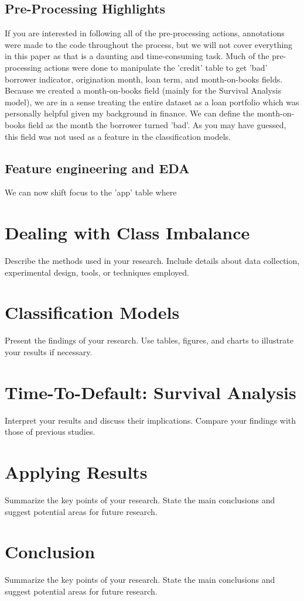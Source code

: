 \documentclass[12pt]{article}
\begin{document}
\subsection{Pre-Processing Highlights}
If you are interested in following all of the pre-processing actions, annotations were made to the code throughout the process, but we will not cover everything in this paper as that is a daunting and time-consuming task.
Much of the pre-processing actions were done to manipulate the 'credit' table to get 'bad' borrower indicator, origination month, loan term, and month-on-books fields.
Because we created a month-on-books field (mainly for the Survival Analysis model), we are in a sense treating the entire dataset as a loan portfolio which was personally helpful given my background in finance.
We can define the month-on-books field as the month the borrower turned 'bad'.
As you may have guessed, this field was not used as a feature in the classification models.
\newpage

\subsection{Feature engineering and EDA}
We can now shift focus to the 'app' table where 


\section{Dealing with Class Imbalance}
Describe the methods used in your research. Include details about data collection, experimental design, tools, or techniques employed.

\section{Classification Models}
Present the findings of your research. Use tables, figures, and charts to illustrate your results if necessary.

\section{Time-To-Default: Survival Analysis}
Interpret your results and discuss their implications. Compare your findings with those of previous studies.

\section{Applying Results}
Summarize the key points of your research. State the main conclusions and suggest potential areas for future research.

\section{Conclusion}
Summarize the key points of your research. State the main conclusions and suggest potential areas for future research.

\printbibliography
\end{document}
